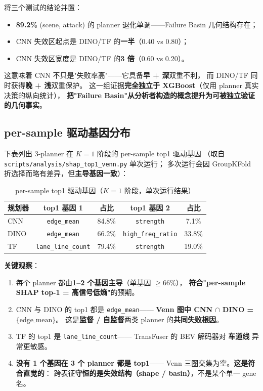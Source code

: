 \documentclass[a4paper,12pt,fontset=fandol]{ctexart}
\newcommand{\gene}[1]{\texttt{#1}}
\newcommand{\planner}[1]{\textsf{#1}}
\begin{document}
{将三个测试的结论并置：

\begin{itemize}
\item \textbf{89.2\%} (scene, attack) 的 planner 退化单调——Failure Basin 几何结构存在；
\item CNN 失效区起点是 DINO/TF 的\textbf{一半}（0.40 vs 0.80）；
\item CNN 失效区宽度是 DINO/TF 的\textbf{3 倍}（0.60 vs 0.20）。
\end{itemize}

这意味着 CNN 不只是"失败率高"——它具备\textbf{早 + 深}双重不利，
而 DINO/TF 同时获得\textbf{晚 + 浅}双重保护。
这一组证据\textbf{完全独立于 XGBoost}（仅用 planner 真实决策的纵向统计），
\textbf{把"Failure Basin"从分析者构造的概念提升为可被独立验证的几何事实}。

\subsection{per-sample 驱动基因分布}

下表列出 3-planner 在 $K\!=\!1$ 阶段的 per-sample top1 驱动基因
（取自 \texttt{scripts/analysis/shap\_top1\_venn.py} 单次运行；
多次运行会因 GroupKFold 折选择而略有差异，但\textbf{主导基因一致}）：

\begin{table}[H]
\centering
\small
\caption{per-sample top1 驱动基因（$K\!=\!1$ 阶段，单次运行结果）}
\begin{tabular}{lcccc}
\toprule
\textbf{规划器} & \textbf{top1 基因 1} & \textbf{占比} & \textbf{top1 基因 2} & \textbf{占比} \\
\midrule
\planner{CNN}  & \gene{edge\_mean}     & 84.8\% & \gene{strength}        & 7.1\% \\
\planner{DINO} & \gene{edge\_mean}     & 66.2\% & \gene{high\_freq\_ratio} & 33.8\% \\
\planner{TF}   & \gene{lane\_line\_count} & 79.4\% & \gene{strength}        & 19.0\% \\
\bottomrule
\end{tabular}
\end{table}

\noindent\textbf{关键观察}：
\begin{enumerate}[leftmargin=*]
\item 每个 planner 都由\textbf{1--2 个基因主导}（单基因 $\geq 66\%$），
  \textbf{符合"per-sample SHAP top-1 = 高信号低熵"}的预期。
\item CNN 与 DINO 的 top1 都是 \gene{edge\_mean}——
  \textbf{Venn 图中 CNN $\cap$ DINO = $\{\text{edge\_mean}\}$}。
  这是\textbf{监督 / 自监督}两类 planner 的\textbf{共同失败根因}。
\item TF 的 top1 是 \gene{lane\_line\_count}——
  TransFuser 的 BEV 解码器对 \textbf{车道线} 异常更敏感。
\item \textbf{没有 1 个基因在 3 个 planner 都是 top1}——
  Venn 三圈交集为空。\textbf{这是符合直觉的}：
  跨表征\textbf{守恒的是失效结构（shape / basin）}，不是某个单一 gene 名。
\end{enumerate}

}
\end{document}
